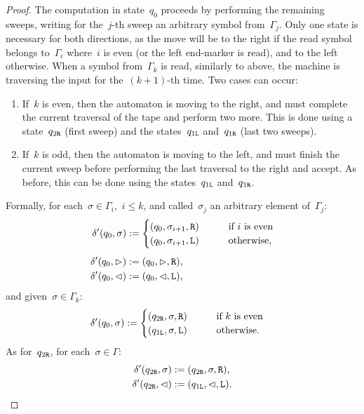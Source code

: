 \begin{proof}
	The computation in state~$q_0$ proceeds by performing the remaining sweeps, writing for the~$j$-th sweep an arbitrary symbol from~$\Gamma_j$.
	Only one state is necessary for both directions, as the move will be to the right if the read symbol belongs to~$\Gamma_i$ where~$i$ is even (or the left end-marker is read), and to the left otherwise.
	When a symbol from~$\Gamma_k$ is read, similarly to above, the machine is traversing the input for the~$(k+1)$-th time. Two cases can occur:
	\begin{enumerate}
		\item If~$k$ is even, then the automaton is moving to the right, and must complete the current traversal of the tape and perform two more. This is done using a state~$q_{2\mathtt{R}}$ (first sweep) and the states~$q_{1\mathtt{L}}$ and~$q_{1\mathtt{R}}$ (last two sweeps).
		\item If~$k$ is odd, then the automaton is moving to the left, and must finish the current sweep before performing the last traversal to the right and accept. As before, this can be done using the states~$q_{1\mathtt{L}}$ and~$q_{1\mathtt{R}}$.
	\end{enumerate}

	Formally, for each~$\sigma\in\Gamma_i$,~$i\le k$, and called~$\sigma_j$ an arbitrary element of~$\Gamma_j$:
	\begin{align*}
		\delta'(q_0,\sigma) & := \begin{cases}
			                         (q_0,\sigma_{i+1},\mathtt R) \qquad & \text{if~$i$ is even}   \\
			                         (q_0,\sigma_{i+1},\mathtt L) \qquad & \text{otherwise} \text,
		                         \end{cases} \\[1ex]
		\delta'(q_0,\rhd)   & := (q_0,\rhd,\mathtt R) \text,                                   \\
		\delta'(q_0,\lhd)   & := (q_0,\lhd,\mathtt L) \text,
	\end{align*}
	and given~$\sigma\in\Gamma_k$:
	\begin{align*}
		\delta'(q_0,\sigma) & := \begin{cases}
			                         (q_{2\mathtt{R}},\sigma,\mathtt R) \qquad & \text{if~$k$ is even}   \\
			                         (q_{1\mathtt{L}},\sigma,\mathtt L) \qquad  & \text{otherwise} \text.
		                         \end{cases}
	\end{align*}
	As for~$q_{2\mathtt{R}}$, for each~$\sigma\in\Gamma$:
	\begin{align*}
		\delta'(q_{2\mathtt{R}},\sigma) & :=(q_{2\mathtt{R}},\sigma,\mathtt R) \text,       \\
		\delta'(q_{2\mathtt{R}},\lhd)   & :=(q_{1\mathtt{L}},\lhd,\mathtt L) \text. \qedhere
	\end{align*}
\end{proof}

